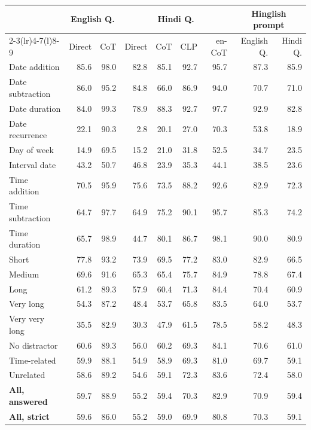 \begin{tabular}{@{}lrrrrrrrr@{}}
\toprule
& \multicolumn{2}{c}{English Q.} & \multicolumn{4}{c}{Hindi Q.} & \multicolumn{2}{c}{Hinglish prompt} \\
\cmidrule(lr){2-3}\cmidrule(lr){4-7}\cmidrule(l){8-9}
& Direct & CoT & Direct & CoT & CLP & en-CoT & English Q. & Hindi Q. \\
\midrule
Date addition & 85.6 & 98.0 & 82.8 & 85.1 & 92.7 & 95.7 & 87.3 & 85.9 \\
Date subtraction & 86.0 & 95.2 & 84.8 & 66.0 & 86.9 & 94.0 & 70.7 & 71.0 \\
Date duration & 84.0 & 99.3 & 78.9 & 88.3 & 92.7 & 97.7 & 92.9 & 82.8 \\
Date recurrence & 22.1 & 90.3 & 2.8 & 20.1 & 27.0 & 70.3 & 53.8 & 18.9 \\
Day of week & 14.9 & 69.5 & 15.2 & 21.0 & 31.8 & 52.5 & 34.7 & 23.5 \\
Interval date & 43.2 & 50.7 & 46.8 & 23.9 & 35.3 & 44.1 & 38.5 & 23.6 \\
Time addition & 70.5 & 95.9 & 75.6 & 73.5 & 88.2 & 92.6 & 82.9 & 72.3 \\
Time subtraction & 64.7 & 97.7 & 64.9 & 75.2 & 90.1 & 95.7 & 85.3 & 74.2 \\
Time duration & 65.7 & 98.9 & 44.7 & 80.1 & 86.7 & 98.1 & 90.0 & 80.9 \\
\midrule
Short & 77.8 & 93.2 & 73.9 & 69.5 & 77.2 & 83.0 & 82.9 & 66.5 \\
Medium & 69.6 & 91.6 & 65.3 & 65.4 & 75.7 & 84.9 & 78.8 & 67.4 \\
Long & 61.2 & 89.3 & 57.9 & 60.4 & 71.3 & 84.4 & 70.4 & 60.9 \\
Very long & 54.3 & 87.2 & 48.4 & 53.7 & 65.8 & 83.5 & 64.0 & 53.7 \\
Very very long & 35.5 & 82.9 & 30.3 & 47.9 & 61.5 & 78.5 & 58.2 & 48.3 \\
\midrule
No distractor & 60.6 & 89.3 & 56.0 & 60.2 & 69.3 & 84.1 & 70.6 & 61.0 \\
Time-related & 59.9 & 88.1 & 54.9 & 58.9 & 69.3 & 81.0 & 69.7 & 59.1 \\
Unrelated & 58.6 & 89.2 & 54.6 & 59.1 & 72.3 & 83.6 & 72.4 & 58.0 \\
\midrule
\textbf{All, answered} & 59.7 & 88.9 & 55.2 & 59.4 & 70.3 & 82.9 & 70.9 & 59.4 \\
\textbf{All, strict} & 59.6 & 86.0 & 55.2 & 59.0 & 69.9 & 80.8 & 70.3 & 59.1 \\
\bottomrule
\end{tabular}
